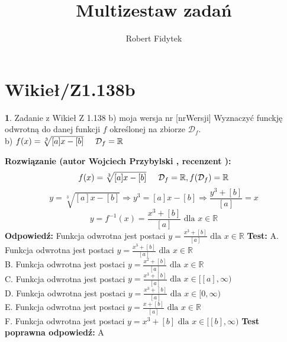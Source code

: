 \documentclass[12pt, a4paper]{article}
\title{Multizestaw zadań}
\author{Robert Fidytek}
\date{}
\theoremstyle{definition} %
\newtheorem{zad}{}
\newcommand{\kategoria}[1]{\section{#1}} %
\newcommand{\zadStart}[1]{\begin{zad}#1\newline} %
\newcommand{\zadStop}{\end{zad}}   %
\newcommand{\rozwStart}[2]{\noindent \textbf{Rozwiązanie (autor #1 , recenzent #2): }\newline} %
\newcommand{\rozwStop}{\newline}                                            %
\newcommand{\odpStart}{\noindent \textbf{Odpowiedź:}\newline}    %
\newcommand{\odpStop}{\newline}                                             %
\newcommand{\testStart}{\noindent \textbf{Test:}\newline} %
\newcommand{\testStop}{\newline} %
\newcommand{\kluczStart}{\noindent \textbf{Test poprawna odpowiedź:}\newline} %
\newcommand{\kluczStop}{\newline} %
\begin{document}
\maketitle


\kategoria{Wikieł/Z1.138b}
\zadStart{Zadanie z Wikieł Z 1.138 b) moja wersja nr [nrWersji]}
Wyznaczyć funckję odwrotną do danej funkcji $f$ określonej na zbiorze $\mathcal{D}_{f}$.\\
b) $f(x)=\sqrt[3]{[a]x-[b]}\hspace{5mm}\mathcal{D}_{f}=\mathbb{R}$
\zadStop
\rozwStart{Wojciech Przybylski}{}
$$f(x)=\sqrt[3]{[a]x-[b]}\hspace{5mm} \mathcal{D}_{f}=\mathbb{R}, f(\mathcal{D}_{f})=\mathbb{R}$$
$$y=\sqrt[3]{[a]x-[b]} \Rightarrow y^{3}=[a]x-[b] \Rightarrow \frac{y^{3}+[b]}{[a]}=x$$
$$y=f^{-1}(x)=\frac{x^{3}+[b]}{[a]} \mbox{ dla } x\in \mathbb{R} $$
\rozwStop
\odpStart
Funkcja odwrotna jest postaci $y=\frac{x^{3}+[b]}{[a]} \mbox{ dla }x\in \mathbb{R}$
\odpStop
\testStart
A. Funkcja odwrotna jest postaci $y=\frac{x^{3}+[b]}{[a]} \mbox{ dla }x\in \mathbb{R}$\\
B. Funkcja odwrotna jest postaci $y=\frac{x^{2}+[b]}{[a]} \mbox{ dla }x\in \mathbb{R}$\\
C. Funkcja odwrotna jest postaci $y=\frac{x^{3}+[b]}{[a]} \mbox{ dla }x\in[[a],\infty)$\\
D. Funkcja odwrotna jest postaci $y=\frac{x^{3}+[b]}{[a]} \mbox{ dla }x\in[0,\infty)$\\
E. Funkcja odwrotna jest postaci $y=\frac{x+[b]}{[a]} \mbox{ dla }x\in \mathbb{R}$\\
F. Funkcja odwrotna jest postaci $y=x^{3}+[b]\mbox{ dla }x\in[[b],\infty)$
\testStop
\kluczStart
A
\kluczStop
\end{document}

